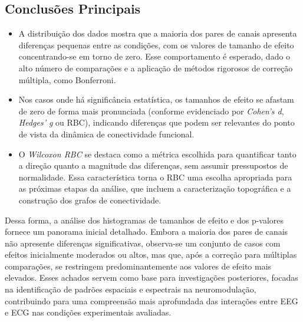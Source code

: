 \subsection{Conclusões Principais}
\begin{itemize}
    \item A distribuição dos dados mostra que a maioria dos pares de canais apresenta diferenças pequenas entre as condições, com os valores de tamanho de efeito concentrando-se em torno de zero. Esse comportamento é esperado, dado o alto número de comparações e a aplicação de métodos rigorosos de correção múltipla, como Bonferroni.
    
    \item Nos casos onde há significância estatística, os tamanhos de efeito se afastam de zero de forma mais pronunciada (conforme evidenciado por \emph{Cohen's d}, \emph{Hedges' g} ou RBC), indicando diferenças que podem ser relevantes do ponto de vista da dinâmica de conectividade funcional.

    \item O \emph{Wilcoxon RBC} se destaca como a métrica escolhida para quantificar tanto a direção quanto a magnitude das diferenças, sem assumir pressupostos de normalidade. Essa característica torna o RBC uma escolha apropriada para as próximas etapas da análise, que incluem a caracterização topográfica e a construção dos grafos de conectividade.

\end{itemize}

Dessa forma, a análise dos histogramas de tamanhos de efeito e dos p-valores fornece um panorama inicial detalhado. Embora a maioria dos pares de canais não apresente diferenças significativas, observa-se um conjunto de casos com efeitos inicialmente moderados ou altos, mas que, após a correção para múltiplas comparações, se restringem predominantemente aos valores de efeito mais elevados. Esses achados servem como base para investigações posteriores, focadas na identificação de padrões espaciais e espectrais na neuromodulação, contribuindo para uma compreensão mais aprofundada das interações entre EEG e ECG nas condições experimentais avaliadas.
